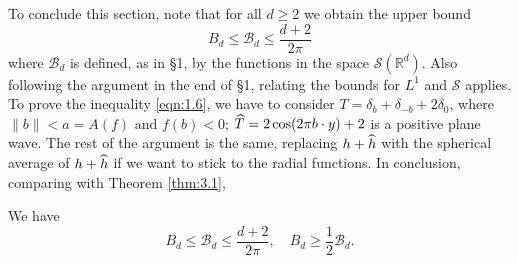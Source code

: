 To conclude this section, note that for all $d \geq 2$ we obtain the upper bound
\begin{equation}
    \label{eqn:3.11}
    B_d \leq \mathcal{B}_{d} \leq \frac{d+2}{2\pi}
\end{equation}
where $\mathcal{B}_{d}$ is defined, as in \S 1, by the functions in the space $\mathcal{S}(\mathbb{R}^{d})$.
Also following the argument in the end of \S 1, relating the bounds for $L^1$ and $\mathcal{S}$ applies.
To prove the inequality \eqref{eqn:1.6}, we have to consider $T = \delta_b + \delta_{-b} + 2 \delta_{0}$, where $\|b\| < a = A(f)$ and $f(b) < 0$; $\widehat{T} = 2 \cos(2 \pi b \cdot y) + 2$ is a positive plane wave.
The rest of the argument is the same, replacing $h + \widehat{h}$ with the spherical average of $h + \widehat{h}$ if we want to stick to the radial functions.
In conclusion, comparing with Theorem \ref{thm:3.1},
\begin{theorem}
\label{thm:3.2}
We have
\begin{equation}
    \label{eqn:3.12}
    B_d \leq \mathcal{B}_{d} \leq \frac{d+2}{2 \pi}, \quad B_d \geq \frac{1}{2} \mathcal{B}_d.
\end{equation}
\end{theorem}

